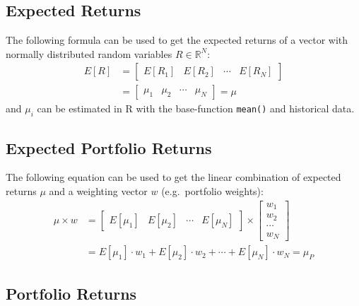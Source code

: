 \documentclass[
  oneside]{book}
\begin{document}
\hypertarget{expected-returns}{%
\subsection{Expected Returns}\label{expected-returns}}

The following formula can be used to get the expected returns of a vector with normally distributed random variables \(R \in \mathbb{R}^{N}\):
\begin{align*}
  E[R] &=
  \begin{bmatrix}
    E[R_{1}] & E[R_{2}] & \cdots & E[R_{N}]  
 \end{bmatrix}\\
 &=
 \begin{bmatrix}
    \mu_{1} & \mu_{2} & \cdots & \mu_{N} 
 \end{bmatrix}
 =
 \mu
\end{align*}
and \(\mu_i\) can be estimated in R with the base-function \texttt{mean()} and historical data.

\hypertarget{expected-portfolio-returns}{%
\subsection{Expected Portfolio Returns}\label{expected-portfolio-returns}}

The following equation can be used to get the linear combination of expected returns \(\mu\) and a weighting vector \(w\) (e.g.~portfolio weights):
\begin{align*}
 \mu \times w &=
  \begin{bmatrix}
    E[\mu_{1}] & E[\mu_{2}] & \cdots & E[\mu_{N}]
 \end{bmatrix}
  \times 
  \begin{bmatrix}
    w_{1} \\ 
    w_{2} \\
    \cdots \\
    w_{N}  
 \end{bmatrix} \\
 &=
 E[\mu_{1}] \cdot w_1 + E[\mu_{2}] \cdot w_2 + \cdots + E[\mu_{N}] \cdot w_{N} 
 =
 \mu_P
\end{align*}

\hypertarget{portfolio-returns}{%
\subsection{Portfolio Returns}\label{portfolio-returns}}
\end{document}
